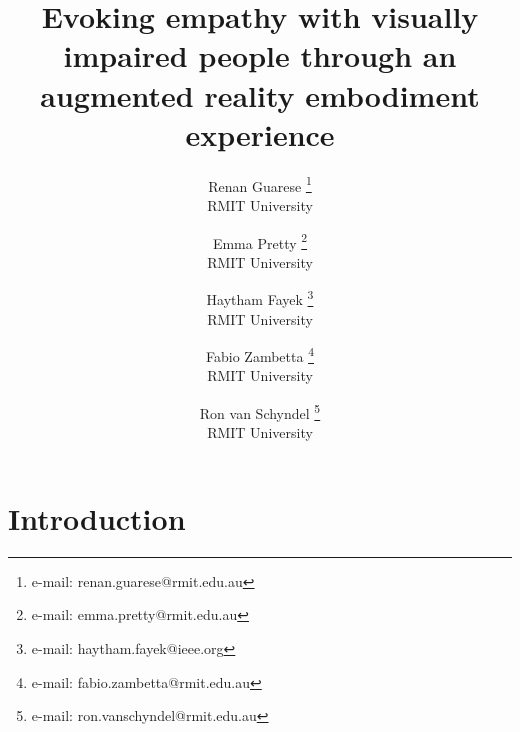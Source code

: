 \documentclass{vgtc}                          %
\title{Evoking empathy with visually impaired people through an augmented reality embodiment experience}
\author{Renan Guarese %
\thanks{e-mail: renan.guarese@rmit.edu.au}\\ %
        \scriptsize RMIT University %
\and Emma Pretty %
\thanks{e-mail: emma.pretty@rmit.edu.au}\\  %
     \scriptsize RMIT University  %
\and Haytham Fayek %
\thanks{e-mail: haytham.fayek@ieee.org }\\ %
     \scriptsize RMIT University %
 \and Fabio Zambetta %
 \thanks{e-mail: fabio.zambetta@rmit.edu.au}\\ %
     \scriptsize RMIT University
     \vspace{10pt}
\and Ron van Schyndel %
\thanks{e-mail: ron.vanschyndel@rmit.edu.au}\\ %
     \scriptsize RMIT University }
\begin{document}


\maketitle




\section{Introduction}


\end{document}
